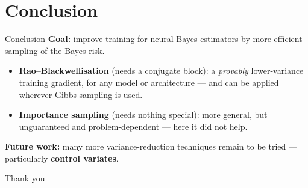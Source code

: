 \documentclass[aspectratio=169,11pt]{beamer}
\begin{document}

\section{Conclusion}

\begin{frame}{Conclusion}
  \textbf{Goal:} improve training for neural Bayes estimators by more efficient sampling of the Bayes risk.
  \begin{itemize}
    \item \textbf{Rao--Blackwellisation} (needs a conjugate block): a \emph{provably} lower-variance training gradient, for any model or architecture --- and can be applied wherever Gibbs sampling is used.
    \item \textbf{Importance sampling} (needs nothing special): more general, but unguaranteed and problem-dependent --- here it did not help.
  \end{itemize}
  \vspace{0.5em}
  \alert{\textbf{Future work:}} many more variance-reduction techniques remain to be tried --- particularly \textbf{control variates}.
\end{frame}

\begin{frame}[standout]
  Thank you
\end{frame}
\end{document}
